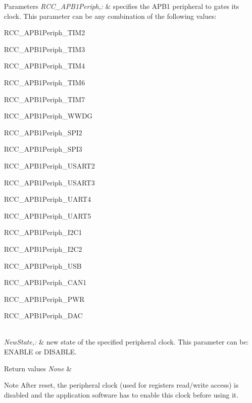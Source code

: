 \begin{DoxyParams}{Parameters}
{\em R\-C\-C\-\_\-\-A\-P\-B1\-Periph,\-:} & specifies the A\-P\-B1 peripheral to gates its clock. This parameter can be any combination of the following values\-: \begin{DoxyItemize}
\item R\-C\-C\-\_\-\-A\-P\-B1\-Periph\-\_\-\-T\-I\-M2 \item R\-C\-C\-\_\-\-A\-P\-B1\-Periph\-\_\-\-T\-I\-M3 \item R\-C\-C\-\_\-\-A\-P\-B1\-Periph\-\_\-\-T\-I\-M4 \item R\-C\-C\-\_\-\-A\-P\-B1\-Periph\-\_\-\-T\-I\-M6 \item R\-C\-C\-\_\-\-A\-P\-B1\-Periph\-\_\-\-T\-I\-M7 \item R\-C\-C\-\_\-\-A\-P\-B1\-Periph\-\_\-\-W\-W\-D\-G \item R\-C\-C\-\_\-\-A\-P\-B1\-Periph\-\_\-\-S\-P\-I2 \item R\-C\-C\-\_\-\-A\-P\-B1\-Periph\-\_\-\-S\-P\-I3 \item R\-C\-C\-\_\-\-A\-P\-B1\-Periph\-\_\-\-U\-S\-A\-R\-T2 \item R\-C\-C\-\_\-\-A\-P\-B1\-Periph\-\_\-\-U\-S\-A\-R\-T3 \item R\-C\-C\-\_\-\-A\-P\-B1\-Periph\-\_\-\-U\-A\-R\-T4 \item R\-C\-C\-\_\-\-A\-P\-B1\-Periph\-\_\-\-U\-A\-R\-T5 \item R\-C\-C\-\_\-\-A\-P\-B1\-Periph\-\_\-\-I2\-C1 \item R\-C\-C\-\_\-\-A\-P\-B1\-Periph\-\_\-\-I2\-C2 \item R\-C\-C\-\_\-\-A\-P\-B1\-Periph\-\_\-\-U\-S\-B \item R\-C\-C\-\_\-\-A\-P\-B1\-Periph\-\_\-\-C\-A\-N1 \item R\-C\-C\-\_\-\-A\-P\-B1\-Periph\-\_\-\-P\-W\-R \item R\-C\-C\-\_\-\-A\-P\-B1\-Periph\-\_\-\-D\-A\-C \end{DoxyItemize}
\\
\hline
{\em New\-State,\-:} & new state of the specified peripheral clock. This parameter can be\-: E\-N\-A\-B\-L\-E or D\-I\-S\-A\-B\-L\-E. \\
\hline
\end{DoxyParams}

\begin{DoxyRetVals}{Return values}
{\em None} & \\
\hline
\end{DoxyRetVals}
\begin{DoxyNote}{Note}
After reset, the peripheral clock (used for registers read/write access) is disabled and the application software has to enable this clock before using it. 
\end{DoxyNote}

